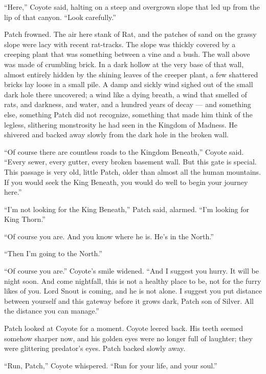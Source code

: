 \documentclass[ebook,oneside,openany,17pt]{memoir}
\newenvironment{tolerant}[1]{%
  \par\tolerance=#1\relax
}{%
  \par
}
\begin{document}
“Here,” Coyote said, halting on a steep and overgrown slope that led
up from the lip of that canyon. “Look carefully.”

Patch frowned. The air here stank of Rat, and the patches of sand on
the grassy slope were lacy with recent rat-tracks. The slope was
thickly covered by a creeping plant that was something between a vine
and a bush. The wall above was made of crumbling brick. In a dark
hollow at the very base of that wall, almost entirely hidden by the
shining leaves of the creeper plant, a few shattered bricks lay loose
in a small pile. A damp and sickly wind sighed out of the small dark
hole there uncovered; a wind like a dying breath, a wind that smelled
of rats, and darkness, and water, and a hundred years of decay — and
something else, something Patch did not recognize, something that made
him think of the legless, slithering monstrosity he had seen in the
Kingdom of Madness. He shivered and backed away slowly from the dark
hole in the broken wall.

“Of course there are countless roads to the Kingdom Beneath,” Coyote
said. “Every sewer, every gutter, every broken basement wall. But this
gate is special. This passage is very old, little Patch, older than
almost all the human mountains. If you would seek the King Beneath,
you would do well to begin your journey here.”

“I’m not looking for the King Beneath,” Patch said, alarmed. “I’m
looking for King Thorn.”

“Of course you are. And you know where he is. He’s in the North.”

“Then I’m going to the North.”

“Of course you are.” Coyote’s smile widened. “And I suggest you
hurry. It will be night soon. And come nightfall, this is not a
healthy place to be, not for the furry likes of you. Lord Snout is
coming, and he is not alone. I suggest you put distance between
yourself and this gateway before it grows dark, Patch son of
Silver. All the distance you can manage.”

\begin{tolerant}{500}
Patch looked at Coyote for a moment. Coyote leered back. His teeth
seemed somehow sharper now, and his golden eyes were no longer full of
laughter; they were glittering predator’s eyes. Patch backed slowly
away.
\end{tolerant}

“Run, Patch,” Coyote whispered. “Run for your life, and your soul.”
\end{document}
